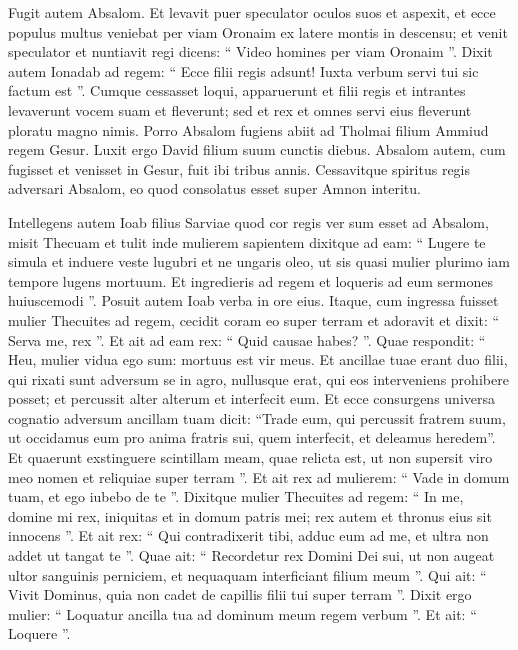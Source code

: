 \begin{biblechapter}
\begin{biblechapter}
\begin{biblechapter}
\begin{biblechapter}
\begin{biblechapter}
\begin{biblechapter}
\begin{biblechapter}
\begin{biblechapter}
\begin{biblechapter}
\begin{biblechapter}
\begin{biblechapter}
\begin{biblechapter}
\begin{biblechapter}
\verse Fugit autem Absalom.
 Et levavit puer speculator oculos suos et aspexit, et ecce populus multus veniebat per viam Oronaim ex latere montis in descensu; et venit speculator et nuntiavit regi dicens: “ Video homines per viam Oronaim ”. 
\verse Dixit autem Ionadab ad regem: “ Ecce filii regis adsunt! Iuxta verbum servi tui sic factum est ”. 
\verse Cumque cessasset loqui, apparuerunt et filii regis et intrantes levaverunt vocem suam et fleverunt; sed et rex et omnes servi eius fleverunt ploratu magno nimis.
 \verse Porro Absalom fugiens abiit ad Tholmai filium Ammiud regem Gesur. Luxit ergo David filium suum cunctis diebus. 
\verse Absalom autem, cum fugisset et venisset in Gesur, fuit ibi tribus annis.
 \verse Cessavitque spiritus regis adversari Absalom, eo quod consolatus esset super Amnon interitu.
 
\begin{biblechapter}
\verse Intellegens autem Ioab filius Sarviae quod cor regis ver sum esset ad Absalom, 
\verse misit Thecuam et tulit inde mulierem sapientem dixitque ad eam: “ Lugere te simula et induere veste lugubri et ne ungaris oleo, ut sis quasi mulier plurimo iam tempore lugens mortuum. 
\verse Et ingredieris ad regem et loqueris ad eum sermones huiuscemodi ”. Posuit autem Ioab verba in ore eius.
 \verse Itaque, cum ingressa fuisset mulier Thecuites ad regem, cecidit coram eo super terram et adoravit et dixit: “ Serva me, rex ”. 
\verse Et ait ad eam rex: “ Quid causae habes? ”. Quae respondit: “ Heu, mulier vidua ego sum: mortuus est vir meus. 
\verse Et ancillae tuae erant duo filii, qui rixati sunt adversum se in agro, nullusque erat, qui eos interveniens prohibere posset; et percussit alter alterum et interfecit eum. 
\verse Et ecce consurgens universa cognatio adversum ancillam tuam dicit: “Trade eum, qui percussit fratrem suum, ut occidamus eum pro anima fratris sui, quem interfecit, et deleamus heredem”. Et quaerunt exstinguere scintillam meam, quae relicta est, ut non supersit viro meo nomen et reliquiae super terram ”. 
\verse Et ait rex ad mulierem: “ Vade in domum tuam, et ego iubebo de te ”. 
\verse Dixitque mulier Thecuites ad regem: “ In me, domine mi rex, iniquitas et in domum patris mei; rex autem et thronus eius sit innocens ”. 
 \verse Et ait rex: “ Qui contradixerit tibi, adduc eum ad me, et ultra non addet ut tangat te ”. 
\verse Quae ait: “ Recordetur rex Domini Dei sui, ut non augeat ultor sanguinis perniciem, et nequaquam interficiant filium meum ”. Qui ait: “ Vivit Dominus, quia non cadet de capillis filii tui super terram ”.
 \verse Dixit ergo mulier: “ Loquatur ancilla tua ad dominum meum regem verbum ”. Et ait: “ Loquere ”. 

\end{biblechapter}
\end{biblechapter}
\end{biblechapter}
\end{biblechapter}
\end{biblechapter}
\end{biblechapter}
\end{biblechapter}
\end{biblechapter}
\end{biblechapter}
\end{biblechapter}
\end{biblechapter}
\end{biblechapter}
\end{biblechapter}
\end{biblechapter}
